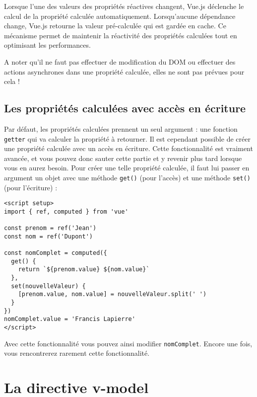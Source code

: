 Lorsque l'une des valeurs des propriétés réactives changent, {\color{monOrange}Vue.js} déclenche le calcul de la propriété calculée automatiquement. Lorsqu'aucune dépendance change, {\color{monOrange}Vue.js} retourne la valeur pré-calculée qui est gardée en cache. Ce mécanisme permet de maintenir la réactivité des propriétés calculées tout en optimisant les performances.

A noter qu'il ne faut pas effectuer de modification du DOM ou effectuer des actions asynchrones dans une propriété calculée, elles ne sont pas prévues pour cela !



\subsection{Les propriétés calculées avec accès en écriture}
Par défaut, les propriétés calculées prennent un seul argument : une fonction {\tt getter} qui va calculer la propriété à retourner. Il est cependant possible de créer une propriété calculée avec un accès en écriture. Cette fonctionnalité est vraiment avancée, et vous pouvez donc sauter cette partie et y revenir plus tard lorsque vous en aurez besoin. Pour créer une telle propriété calculée, il faut lui passer en argument un objet avec une méthode {\tt get()} (pour l'accès) et une méthode {\tt set()} (pour l'écriture) :
\begin{verbatim}
<script setup>
import { ref, computed } from 'vue'

const prenom = ref('Jean')
const nom = ref('Dupont')

const nomComplet = computed({
  get() {
    return `${prenom.value} ${nom.value}`
  },
  set(nouvelleValeur) {
    [prenom.value, nom.value] = nouvelleValeur.split(' ')
  }
})
nomComplet.value = 'Francis Lapierre'
</script>
\end{verbatim}
Avec cette fonctionnalité vous pouvez ainsi modifier {\tt nomComplet}. Encore une fois, vous rencontrerez rarement cette fonctionnalité.



\section{La directive v-model}
